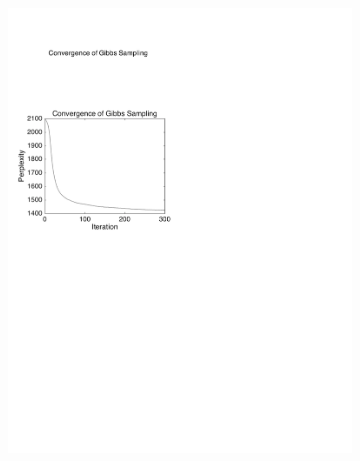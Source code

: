 \documentclass{article} %
\begin{document}
\begin{figure}
\begin{subfigure}[b]{.5\linewidth}
\centering
\includegraphics[width=1\textwidth]{AP_topics_10_GS_Perplexity}
\end{subfigure}%
\begin{subfigure}[b]{.5\linewidth}
\centering

\end{subfigure}
\end{figure}
\end{document}
